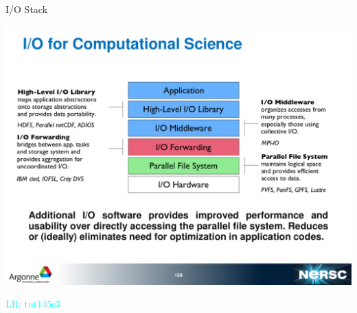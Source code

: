\documentclass[compress,11pt,xcolor=svgnames,aspectratio=169]{beamer}
\newcommand{\lr}[1]{\textcolor{cyan}{LR: #1}}
\begin{document}
\begin{frame}[fragile]{I/O Stack}
\begin{center}
\includegraphics[scale=0.1]{fig/io-stack2}
\end{center}

\lr{tut145s3}

\end{frame}
\end{document}
